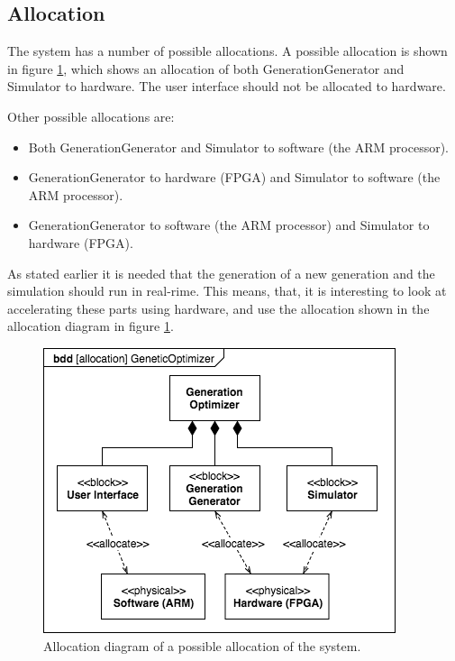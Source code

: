 \subsection{Allocation}\label{sec:allocation}
The system has a number of possible allocations. A possible allocation is shown in figure \ref{fig:allocation}, which shows an allocation of both GenerationGenerator and Simulator to hardware. The user interface should not be allocated to hardware.

Other possible allocations are: \begin{itemize} 
\item Both GenerationGenerator and Simulator to software (the ARM processor).
\item GenerationGenerator to hardware (FPGA) and Simulator to software (the ARM processor).
\item GenerationGenerator to software (the ARM processor) and Simulator to hardware (FPGA).
\end{itemize}

As stated earlier it is needed that the generation of a new generation and the simulation should run in real-rime. This means, that, it is interesting to look at accelerating these parts using hardware, and use the allocation shown in the allocation diagram in figure \ref{fig:allocation}.

\begin{figure}[htbp]
\begin{centering}
\includegraphics[width=0.9\linewidth]{../diagrams/allocation.png}
\caption{Allocation diagram of a possible allocation of the system.}
\label{fig:allocation}
\end{centering}
\end{figure}

